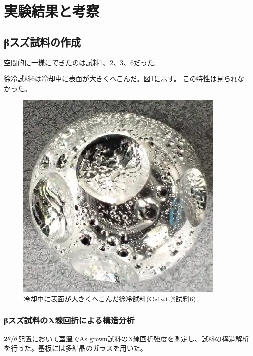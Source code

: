 \section{実験結果と考察}

\subsection{βスズ試料の作成}
空間的に一様にできたのは試料1、2、3、6だった。

徐冷試料6は冷却中に表面が大きくへこんだ。図\ref{fig:sample6_asgrown}に示す。
この特性は見られなかった。
\begin{figure}[!h]
    \begin{center}
   \includegraphics[width=0.8\hsize]{results_discussions/sample6_asgrown.eps}
  \end{center}
  \caption{冷却中に表面が大きくへこんだ徐冷試料(Ge1wt.\%試料6)}
  \label{fig:sample6_asgrown}
\end{figure}

\subsubsection{βスズ試料のX線回折による構造分析}
$\rm 2\theta/\theta$配置において室温でAs grown試料のX線回折強度を測定し、試料の構造解析を行った。基板には多結晶のガラスを用いた。

